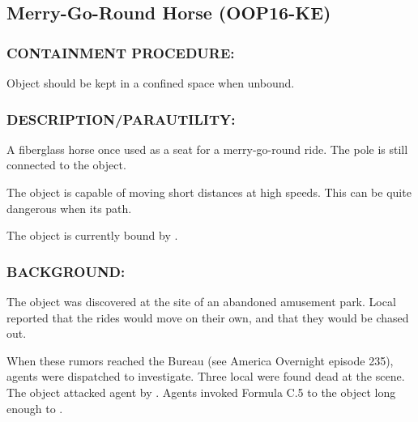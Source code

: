 \subsection*{Merry-Go-Round Horse (OOP16-KE)}
\subsubsection*{CONTAINMENT PROCEDURE:}
\par Object should be kept in a confined
space when unbound.
\subsubsection*{DESCRIPTION/PARAUTILITY:}
\par A fiberglass horse once used as a seat
for a merry-go-round ride. The pole is
still connected to the object.
\par The object is capable of moving short distances at high speeds.
This can be quite dangerous when  its path.
\par The object is currently bound by .
\subsubsection*{BACKGROUND:}
\par The object was discovered at the site of an abandoned
amusement park. Local  reported that the rides would move on their own, and that they would be chased out.
\par When these rumors reached the Bureau (see America Overnight
episode 235), agents were dispatched to investigate. Three local 
were found dead at the scene. The object attacked
agent  by . Agents invoked Formula C.5 to  the object long enough to
.
